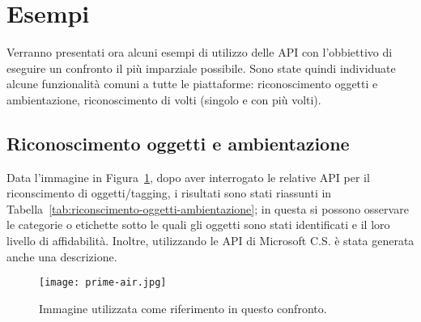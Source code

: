 
\section{Esempi}\label{sec:esempi}
Verranno presentati ora alcuni esempi di utilizzo delle API con l'obbiettivo di eseguire un confronto il più imparziale possibile.
Sono state quindi individuate alcune funzionalità comuni a tutte le piattaforme: riconoscimento oggetti e ambientazione, riconoscimento di volti (singolo e con più volti).
\subsection{Riconoscimento oggetti e ambientazione}\label{subsec:riconscimento-oggetti-ambientazione}
Data l'immagine in Figura~\ref{fig:riconscimento-oggetti-ambientazione}, dopo aver interrogato le relative API per il riconscimento di oggetti/tagging,
i risultati sono stati riassunti in Tabella~\ref{tab:riconscimento-oggetti-ambientazione}; in questa si possono osservare le categorie o etichette sotto le quali
gli oggetti sono stati identificati e il loro livello di affidabilità.
Inoltre, utilizzando le API di Microsoft C.S. è stata generata anche una descrizione.
%
\begin{figure}[!h]
\begin{center}
	\texttt{[image: prime-air.jpg]}
{\scriptsize \caption{Immagine utilizzata come riferimento in questo confronto.}
\label{fig:riconscimento-oggetti-ambientazione}}
\end{center}
\end{figure}
%
